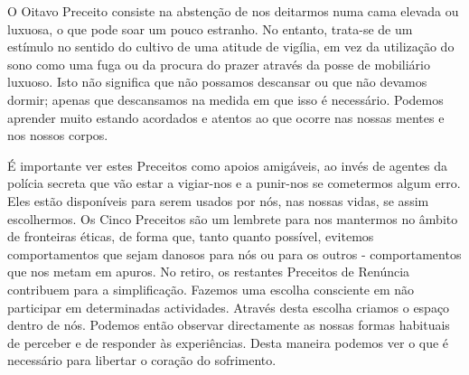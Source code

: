 O Oitavo Preceito consiste na abstenção de nos deitarmos numa cama
elevada ou luxuosa, o que pode soar um pouco estranho. No entanto,
trata-se de um estímulo no sentido do cultivo de uma atitude de vigília,
em vez da utilização do sono como uma fuga ou da procura do prazer
através da posse de mobiliário luxuoso. Isto não significa que não
possamos descansar ou que não devamos dormir; apenas que descansamos na
medida em que isso é necessário. Podemos aprender muito estando
acordados e atentos ao que ocorre nas nossas mentes e nos nossos corpos.

É importante ver estes Preceitos como apoios amigáveis, ao invés de
agentes da polícia secreta que vão estar a vigiar-nos e a \mbox{punir-nos} se
cometermos algum erro. Eles estão disponíveis para serem usados por nós,
nas nossas vidas, se assim escolhermos. Os Cinco Preceitos são um
lembrete para nos mantermos no âmbito de fronteiras éticas, de forma
que, tanto quanto possível, evitemos comportamentos que sejam danosos
para nós ou para os outros - comportamentos que nos metam em apuros. No
retiro, os restantes Preceitos de Renúncia contribuem para a
simplificação. Fazemos uma escolha consciente em não participar em
determinadas actividades. Através desta escolha criamos o espaço dentro
de nós. Podemos então observar directamente as nossas formas habituais
de perceber e de responder às experiências. Desta maneira podemos ver o
que é necessário para libertar o coração do sofrimento.

